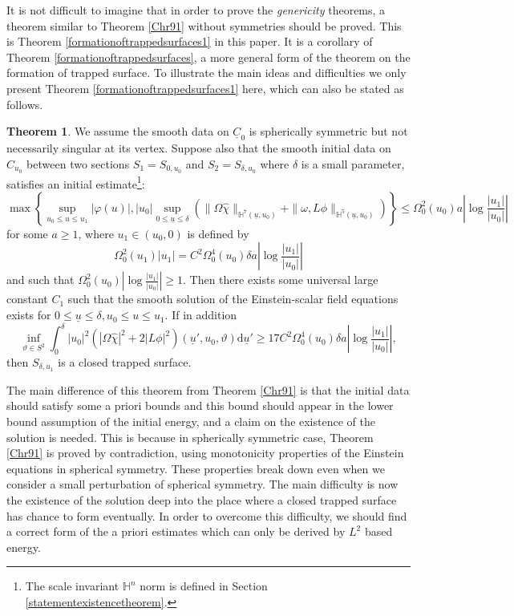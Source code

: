 \documentclass[11pt,reqno]{amsart}
\theoremstyle{definition}
\newtheorem{theorem}{Theorem}[section]
\numberwithin{equation}{section}
\newcommand{\D}{\mathrm{d}}
\renewcommand{\H}{\mathbb{H}}
\def\chih{\widehat{\chi}}
\def\ub{\underline{u}}
\def\Cb{\underline{C}}
\begin{document}
It is not difficult to imagine that in order to prove the \emph{genericity} theorems, a theorem similar to Theorem \ref{Chr91} without symmetries should be proved. This is Theorem \ref{formationoftrappedsurfaces1} in this paper. It is a corollary of  Theorem \ref{formationoftrappedsurfaces}, a more general form of the theorem on the formation of trapped surface. To illustrate the main ideas and difficulties %
we only present Theorem \ref{formationoftrappedsurfaces1} here, which can also be stated as follows.
 \begin{theorem}\label{formationrough}
We assume the smooth data on $\Cb_0$ is spherically symmetric but not necessarily singular at its vertex. Suppose also that the smooth initial data on $C_{u_0}$ between two sections $S_{1}=S_{0,u_0}$ and $S_2=S_{\delta,u_0}$ where $\delta$ is a small parameter, satisfies an initial estimate\footnote{The scale invariant $\H^n$ norm is defined in Section \ref{statementexistencetheorem}.}:
 \begin{equation*}
\max\left\{\sup_{u_0\le u\le u_1}|\varphi(u)|,|u_0|\sup_{0\le\ub\le\delta}\left(\|\Omega\chih\|_{\H^7(\ub,u_0)}+\|\omega, L\phi\|_{\H^5(\ub,u_0)}\right)\right\}\le\Omega_0^2(u_0)a\left|\log\frac{|u_1|}{|u_0|}\right|
 \end{equation*}
for some $a\ge1$, where $u_1\in(u_0,0)$ is defined by
\begin{equation}\label{def-u1introduction}
\Omega^2_0(u_1)|u_1|=C^2\Omega_0^4(u_0)\delta a\left|\log\frac{|u_1|}{|u_0|}\right|
\end{equation}
and such that $\Omega_0^2(u_0)\left|\log\frac{|u_1|}{|u_0|}\right|\ge1$. Then there exists some universal large constant $C_1$ such that the smooth solution of the Einstein-scalar field equations exists for $0\le \ub\le\delta, u_0\le u\le u_1$. If in addition
\begin{equation}\label{ourm2-m1}
\inf_{\vartheta\in S^2}\int_0^{\delta}|u_0|^2(|\Omega\chih|^2+2|L\phi|^2)(\ub',u_0,\vartheta)\D\ub'\ge  17C^2\Omega_0^4(u_0)\delta a\left|\log\frac{|u_1|}{|u_0|}\right|,
\end{equation}
then $S_{\delta,u_1}$ is a closed trapped surface.
\end{theorem}
The main difference of this theorem from Theorem \ref{Chr91} is that the initial data should satisfy some a priori bounds and this bound should appear in the lower bound assumption of the initial energy, and a claim on the existence of the solution is needed. This is because in spherically symmetric case, Theorem \ref{Chr91} is proved by contradiction, using monotonicity properties of the Einstein equations in spherical symmetry. These properties break down even when we consider a small perturbation of spherical symmetry. The main difficulty is now the existence of the solution deep into the place where a closed trapped surface has chance to form eventually. In order to overcome this difficulty, we should find a correct form of the a priori estimates which can only be derived by $L^2$ based energy. 
\end{document}
